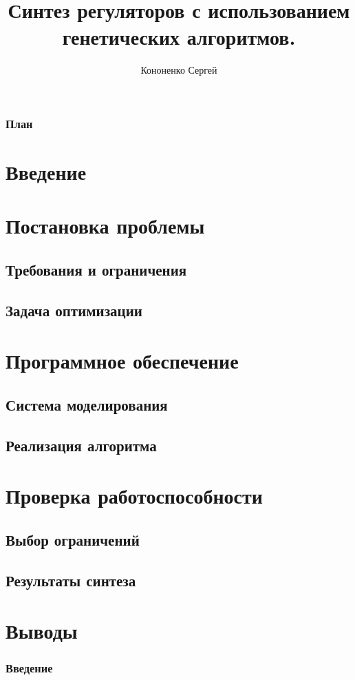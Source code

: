 \documentclass{beamer}
\title{Синтез регуляторов с использованием генетических алгоритмов.}
\author{Кононенко Сергей}
\begin{document}
	\begin{frame}
		\titlepage
	\end{frame}
	
	\begin{frame}
		\frametitle{План}
		\tableofcontents
	\end{frame}
	
	\section{Введение}
	
	\section{Постановка проблемы}		
	\subsection{Требования и ограничения}	
	\subsection{Задача оптимизации}
	
	\section{Программное обеспечение}
	\subsection{Система моделирования}				
	\subsection{Реализация алгоритма}		
	
	\section{Проверка работоспособности}
	\subsection{Выбор ограничений}				
	\subsection{Результаты синтеза}		
	
	\section{Выводы}	
	
	\begin{frame}
		\frametitle{Введение}
	\end{frame}
	
\end{document}
